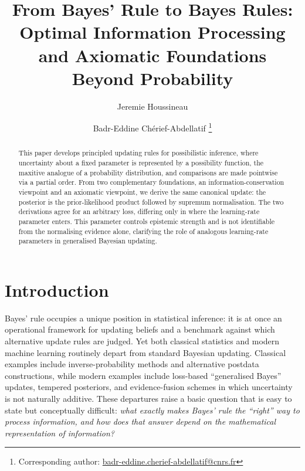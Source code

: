 \documentclass[accepted]{uai2026} %
\title{From Bayes' Rule to Bayes Rules: \\
Optimal Information Processing and Axiomatic Foundations Beyond Probability}
\author[1]{Jeremie Houssineau}
\author[2]{Badr-Eddine Ch\'erief-Abdellatif \thanks{Corresponding author:  \href{mailto:badr-eddine.cherief-abdellatif@cnrs.fr}{badr-eddine.cherief-abdellatif@cnrs.fr}}}
\affil[1]{%
    Nanyang Technological University, Singapore
}
\affil[2]{%
    CNRS, LPSM, Sorbonne Universit\'e, France
}
\theoremstyle{remark}
\begin{document}
\maketitle

\begin{abstract}
This paper develops principled updating rules for possibilistic inference, where uncertainty about a fixed parameter is represented by a possibility function, the maxitive analogue of a probability distribution, and comparisons are made pointwise via a partial order. From two complementary foundations, an information-conservation viewpoint and an axiomatic viewpoint, we derive the same canonical update: the posterior is the prior-likelihood product followed by supremum normalisation. The two derivations agree for an arbitrary loss, differing only in where the learning-rate parameter enters. This parameter controls epistemic strength and is not identifiable from the normalising evidence alone, clarifying the role of analogous learning-rate parameters in generalised Bayesian updating.
\end{abstract}


\section{Introduction}

Bayes' rule occupies a unique position in statistical inference: it is at once an operational framework for updating beliefs and a benchmark against which alternative update rules are judged. Yet both classical statistics and modern machine learning routinely depart from standard Bayesian updating. Classical examples include inverse-probability methods and alternative postdata constructions, while modern examples include loss-based ``generalised Bayes'' updates, tempered posteriors, and evidence-fusion schemes in which uncertainty is not naturally additive. These departures raise a basic question that is easy to state but conceptually difficult: \emph{what exactly makes Bayes' rule the ``right'' way to process information, and how does that answer depend on the mathematical representation of information?}
\end{document}
